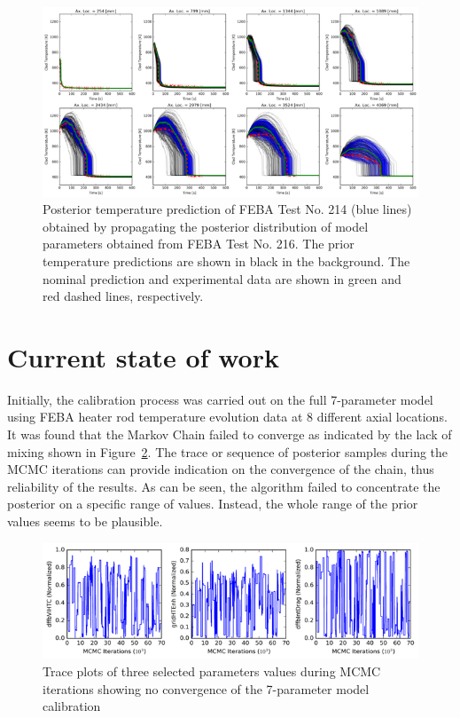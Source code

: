 \documentclass[11pt,titlepage]{article}
\begin{document}
\begin{figure}[h!]
	\centering
	\includegraphics[scale=0.95]{figures/uqrun.png}
	\caption{Posterior temperature prediction of FEBA Test No. 214 (blue lines)
	    obtained by propagating the posterior distribution of model parameters
	    obtained from FEBA Test No. 216. The prior temperature predictions are 
	    shown in black in the background. The nominal prediction and 
	    experimental data are shown in green and red dashed lines, respectively.}
	\label{fig:uqrun}
\end{figure}


\section{Current state of work}

Initially, the calibration process was carried out on the full 7-parameter 
model using FEBA heater rod temperature evolution data at 8 different axial 
locations. 
It was found that the Markov Chain failed to converge as indicated by the 
lack of mixing shown in Figure~\ref{fig:nonconv}. 
The trace or sequence of posterior samples during the MCMC iterations can 
provide indication on the convergence of the chain, thus reliability of the 
results. As can be seen, the algorithm failed to concentrate the posterior 
on a specific range of values. 
Instead, the whole range of the prior values seems to be plausible.

\begin{figure}[h!]
	\centering
	\includegraphics[scale=0.90]{figures/nonconv.png}
	\caption{Trace plots of three selected parameters values during 
	    MCMC iterations showing no convergence of the 7-parameter
	    model calibration}
	\label{fig:nonconv}
\end{figure}
\end{document}
